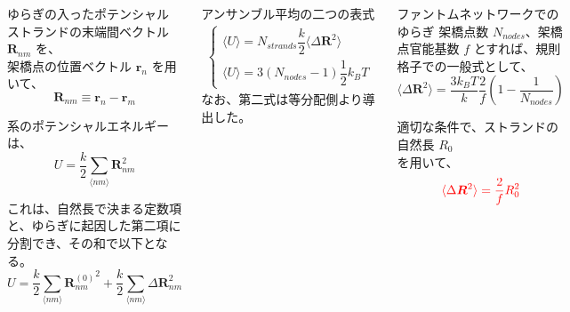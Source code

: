 \documentclass[11pt, dvipdfmx]{beamer}
\begin{document}
\begin{appendix}
\begin{frame}
\begin{columns}[totalwidth=1\textwidth]
\scriptsize
\begin{block}{ゆらぎの入ったポテンシャル}
ストランドの末端間ベクトル $\bm{R}_{nm}$ を、\\架橋点の位置ベクトル $\bm{r}_n$ を用いて、
\vspace{-3mm}
\begin{equation*}
\bm{R}_{nm} \equiv \bm{r}_n-\bm{r}_m
\end{equation*}

系のポテンシャルエネルギーは、
\vspace{-3mm}
\begin{equation*}
U=\dfrac{k}{2} \sum_{\langle nm \rangle} \bm{R}_{nm}^2
\end{equation*}

これは、自然長で決まる定数項と、ゆらぎに起因した第二項に分割でき、その和で以下となる。
\vspace{-3mm}
\begin{equation*}
U=\dfrac{k}{2} \sum_{\langle nm \rangle} {\bm{R}_{nm}^{(0)}}^2 + \dfrac{k}{2} \sum_{\langle nm \rangle} \Delta \bm{R}_{nm}^2
\end{equation*}
\end{block}

\scriptsize
\begin{block}{アンサンブル平均の二つの表式}
\vspace{-5mm}
\begin{align*}
 \begin{cases}
	\langle U \rangle = N_{strands} \dfrac{k}{2} \langle \Delta \bm{R}^2 \rangle \\
	\langle U \rangle = 3(N_{nodes}-1) \dfrac{1}{2} k_B T
 \end{cases}
\end{align*}
なお、第二式は等分配側より導出した。
\end{block}

\begin{exampleblock}{ファントムネットワークでのゆらぎ}
架橋点数 $N_{nodes}$、架橋点官能基数 $f$ とすれば、規則格子での一般式として、
\vspace{-3mm}
\begin{equation*}
\langle \Delta \bm{R}^2 \rangle = \dfrac{3k_B T}{k} \dfrac{2}{f} \left( 1-\dfrac{1}{N_{nodes}} \right)
\end{equation*}

適切な条件で、ストランドの自然長 $R_0$\\
を用いて、
\vspace{-3mm}
\begin{equation*}
\color{red}
\langle \Delta \bm{R}^2 \rangle = \dfrac{2}{f} R_0^2
\end{equation*}
\vspace{-6mm}
\end{exampleblock}


\end{columns}
\end{frame}
\end{appendix}
\end{document}
